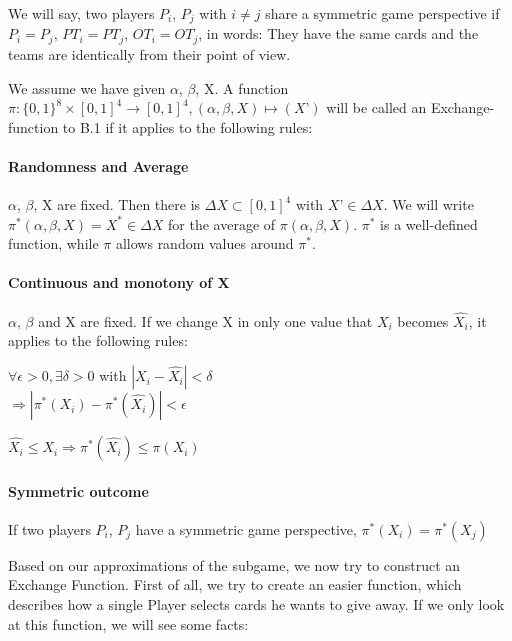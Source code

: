 \begin{definition}
We will say, two players $P_i$, $P_j$ with  $i \neq j$ share a symmetric game perspective if $P_i = P_j$, $PT_i = PT_j$, $OT_i = OT_j$, in words: They have the same cards and the teams are identically from their point of view. 
\end{definition}
\begin{definition}
We assume we have given $\alpha$, $\beta$, X. A function $\pi: \{0,1\}^8 \times [0,1]^4 \to [0,1]^4, (\alpha, \beta, X) \mapsto (X’)$ will be called an Exchange-function to B.1  if it applies to the following rules:
\paragraph{Randomness and Average}
$\alpha$, $\beta$, X are fixed. Then there is $\Delta X \subset [0,1]^4$ with $X’ \in \Delta X$. We will write $\pi^* (\alpha, \beta, X) = X^* \in \Delta X$ for the average of $\pi(\alpha, \beta, X)$. $\pi^*$ is a well-defined function, while $\pi$ allows random values around $\pi^*$.
\paragraph{Continuous and monotony of X}
$\alpha$, $\beta$ and X are fixed. If we change X in only one value that $X_i$ becomes $\widehat{X_i}$, it applies to the following rules:
\begin{axioms}[(C1)]
\item $\forall \epsilon > 0, \exists \delta > 0$ with $| X_i - \widehat{X_i}| < \delta$ \\$\Rightarrow | \pi^*(X_i) - \pi^*(\widehat{X_i}) | < \epsilon $
\item $\widehat{X_i} \leq X_i \Rightarrow \pi^*(\widehat{X_i}) \leq \pi(X_i)$
\end{axioms}

\paragraph{Symmetric outcome}
If two players $P_i$, $P_j$ have a symmetric game perspective, $\pi^*(X_i) = \pi^*(X_j)$
\end{definition}

Based on our approximations of the subgame, we now try to construct an Exchange Function. First of all, we try to create an easier function, which describes how a single Player selects cards he wants to give away. If we only look at this function, we will see some facts:

